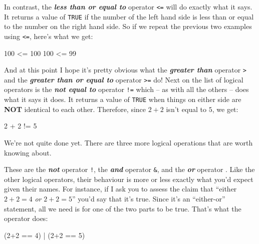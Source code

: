 \documentclass[
]{book}
\newenvironment{Shaded}{\begin{snugshade}}{\end{snugshade}}
\newcommand{\DecValTok}[1]{\textcolor[rgb]{0.00,0.00,0.81}{#1}}
\newcommand{\NormalTok}[1]{#1}
\newcommand{\SpecialCharTok}[1]{\textcolor[rgb]{0.00,0.00,0.00}{#1}}
\begin{document}
In contrast, the \textbf{\emph{less than or equal to}} operator \texttt{\textless{}=} will do exactly what it says. It returns a value of \texttt{TRUE} if the number of the left hand side is less than or equal to the number on the right hand side. So if we repeat the previous two examples using \texttt{\textless{}=}, here's what we get:

\begin{Shaded}
\begin{Highlighting}[]
\DecValTok{100} \SpecialCharTok{\textless{}=} \DecValTok{100}
\DecValTok{100} \SpecialCharTok{\textless{}=} \DecValTok{99}
\end{Highlighting}
\end{Shaded}

And at this point I hope it's pretty obvious what the \textbf{\emph{greater than}} operator \texttt{\textgreater{}} and the \textbf{\emph{greater than or equal to}} operator \texttt{\textgreater{}=} do! Next on the list of logical operators is the \textbf{\emph{not equal to}} operator \texttt{!=} which -- as with all the others -- does what it says it does. It returns a value of \texttt{TRUE} when things on either side are \textbf{NOT} identical to each other. Therefore, since \(2+2\) isn't equal to \(5\), we get:

\begin{Shaded}
\begin{Highlighting}[]
\DecValTok{2} \SpecialCharTok{+} \DecValTok{2} \SpecialCharTok{!=} \DecValTok{5}
\end{Highlighting}
\end{Shaded}

We're not quite done yet. There are three more logical operations that are worth knowing about.

These are the \textbf{\emph{not}} operator \texttt{!}, the \textbf{\emph{and}} operator \texttt{\&}, and the \textbf{\emph{or}} operator \texttt{\textbar{}}. Like the other logical operators, their behaviour is more or less exactly what you'd expect given their names. For instance, if I ask you to assess the claim that ``either \(2+2 = 4\) \emph{or} \(2+2 = 5\)'' you'd say that it's true. Since it's an ``either-or'' statement, all we need is for one of the two parts to be true. That's what the \texttt{\textbar{}} operator does:

\begin{Shaded}
\begin{Highlighting}[]
\NormalTok{(}\DecValTok{2}\SpecialCharTok{+}\DecValTok{2} \SpecialCharTok{==} \DecValTok{4}\NormalTok{) }\SpecialCharTok{|}\NormalTok{ (}\DecValTok{2}\SpecialCharTok{+}\DecValTok{2} \SpecialCharTok{==} \DecValTok{5}\NormalTok{)}
\end{Highlighting}
\end{Shaded}
\end{document}
